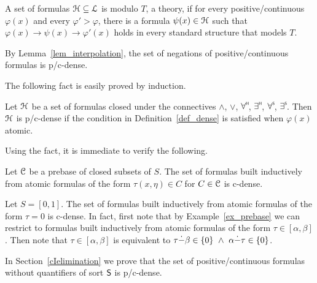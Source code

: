 \documentclass{amsproc}
\def\dotminus{\stackon[.2ex]{$-$}{$.$}}
\renewcommand*{\emph}[1]{%
   \smash{\tikz[baseline]\node[rectangle, fill=teal!25, rounded corners, inner xsep=0.5ex, inner ysep=0.2ex, anchor=base, minimum height = 2.7ex]{\strut #1};}}
\begin{document}
\begin{definition}\label{def_dense}
  A set of formulas ${\EuScript H}\subseteq{\EuScript L}$ is \emph{p/c-dense\/} modulo $T$, a theory, if for every positive/continuous $\varphi(x)$ and every $\varphi'>\varphi$, there is a formula $\psi(x)\in{\EuScript H}$ such that $\varphi(x)\rightarrow\psi(x)\rightarrow\varphi'(x)$ holds in every standard structure that models $T$.
\end{definition}

\begin{example}
  By Lemma~\ref{lem_interpolation}, the set of negations of positive/continuous formulas is p/c-dense.
\end{example}

The following fact is easily proved by induction.

\begin{fact}
  Let ${\EuScript H}$ be a set of formulas closed under the connectives $\wedge$, $\vee$, $\forall\raisebox{1.1ex}{\scaleto{\sf H}{.8ex}\kern-.2ex}$, $\exists\raisebox{1.1ex}{\scaleto{\sf H}{.8ex}\kern-.2ex}$, $\forall\raisebox{1.1ex}{\scaleto{\sf S}{.8ex}\kern-.2ex}$, $\exists\raisebox{1.1ex}{\scaleto{\sf S}{.8ex}\kern-.2ex}$.
  Then ${\EuScript H}$ is p/c-dense if the condition in Definition~\ref{def_dense} is satisfied when $\varphi(x)$ atomic.
\end{fact}

Using the fact, it is immediate to verify the following.

\begin{example}\label{ex_prebase}
  Let ${\EuScript C}$ be a prebase of closed subsets of $S$.
  The set of formulas built inductively from atomic formulas of the form $\tau(x,\eta)\in C$ for $C\in{\EuScript C}$ is c-dense.
\end{example}

\begin{example}
  Let $S=[0,1]$.
  The set of formulas built inductively from atomic formulas of the form $\tau=0$ is c-dense.
  In fact, first note that by Example~\ref{ex_prebase} we can restrict to formulas built inductively from atomic formulas of the form $\tau\in[\alpha,\beta]$.
  Then note that $\tau\in[\alpha,\beta]$ is equivalent to $\tau\dotminus\beta\in\{0\}\ \wedge\ \alpha\dotminus\tau\in\{0\}$.
\end{example}

In Section~\ref{cIelimination} we prove that the set of positive/continuous formulas without quantifiers of sort ${\sf S}$ is p/c-dense.
\end{document}
